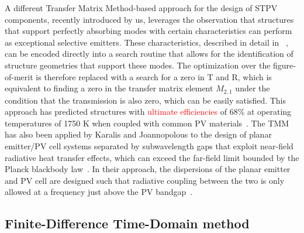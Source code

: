 \documentclass[review]{elsarticle}
\begin{document}
A different Transfer Matrix Method-based approach for the design of STPV components, recently introduced by us, 
leverages the observation that structures that support perfectly absorbing modes with 
certain characteristics can perform as exceptional selective emitters.  These characteristics, described in detail in
~\cite{FUS_OptExp_2015}, can be
encoded directly into a search routine that allows for the identification of structure geometries that support these modes.  The
optimization over the figure-of-merit is therefore replaced with a search for a zero in T and R, which is equivalent to finding
a zero in the transfer matrix element $M_{2,1}$ under the condition that the transmission is also zero, which can be easily satisfied.
This approach has predicted structures with \textcolor{red}{ultimate efficiencies} of 68\% at operating temperatures of 1750 K when coupled
with common PV materials~\cite{FUS_OptExp_2015}. The TMM has also been applied by Karalis and Joannopolous to the design of planar emitter/PV cell
systems separated by subwavelength gaps that exploit near-field radiative heat transfer effects, which can exceed the far-field
limit bounded by the Planck blackbody law~\cite{KJ_SciRep_2016}.  In their approach, the dispersions of the planar emitter and PV cell are designed
such that radiative coupling between the two is only allowed at a frequency just above the PV bandgap~\cite{KJ_SciRep_2016}.

\subsection{Finite-Difference Time-Domain method}
\end{document}
